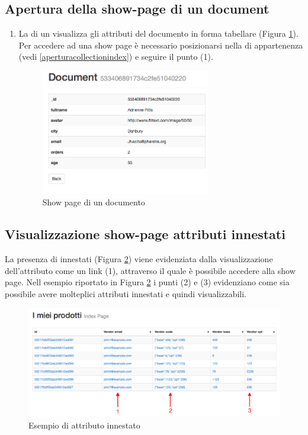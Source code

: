 	\clearpage
	\subsection{Apertura della show-page di un document} %
	\label{aperturashowpage}
		\begin{enumerate}
			\item La  di un  visualizza gli attributi del documento in forma tabellare (Figura \ref{fig:showpage}). Per accedere ad una show page è necessario posizionarsi nella  di appartenenza (vedi \ref{aperturacollectionindex}) e seguire il punto (1).

			\begin{figure}[H]
				\centering \includegraphics[width=0.7\textwidth]{img/showpage.png}
			\caption{\label{fig:showpage} Show page di un documento}
			\end{figure}
		\end{enumerate}

	\clearpage
	\subsection{Visualizzazione show-page attributi innestati} %
			La presenza di  innestati (Figura \ref{fig:attributiInnestati}) viene evidenziata dalla visualizzazione dell'attributo come un link (1), attraverso il quale è possibile accedere alla show page. Nell esempio riportato in Figura \ref{fig:attributiInnestati} i punti (2) e (3) evidenziano come sia possibile avere molteplici attributi innestati e quindi visualizzabili.

			\begin{figure}[H]
				\centering \includegraphics[width=1\textwidth]{img/attributiInnestati.png}
			\caption{\label{fig:attributiInnestati} Esempio di attributo innestato}
			\end{figure}


